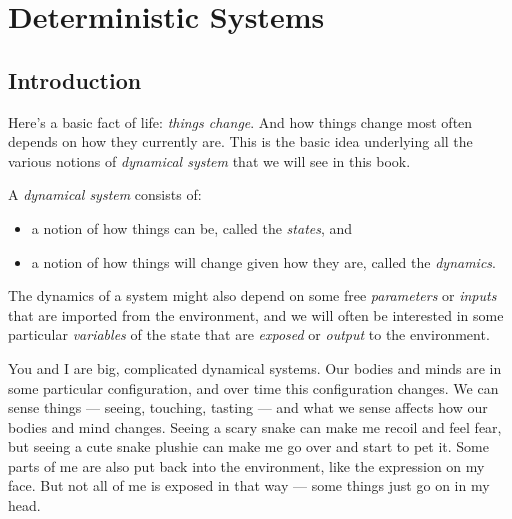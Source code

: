 \documentclass[DynamicalBook]{subfiles}
\begin{document}
%




\setcounter{chapter}{0}%


\chapter{Deterministic Systems}\label{chapter.1}

\section{Introduction}\label{sec.chap1_intro}

Here's a basic fact of life: \emph{things change}. And how things change most
often depends on how they currently are. This is the basic idea underlying all the various notions of \emph{dynamical
  system} that we will see in this book.

\begin{informal}\label{inf.dynam_sys}
  A \emph{dynamical system} consists of:
  \begin{itemize}
  \item a notion of how things can be, called the \emph{states}, and
  \item a notion of how things will change given how they are, called the \emph{dynamics}.
  \end{itemize}
  The dynamics of a system might also depend on some free \emph{parameters} or \emph{inputs} that are imported from the environment, and
  we will often be interested in some particular \emph{variables} of the
  state that are \emph{exposed} or \emph{output} to the environment. 
\end{informal}

You and I are big, complicated dynamical systems. Our bodies and minds are in
some particular configuration, and over time this configuration changes. We can
sense things --- seeing, touching, tasting --- and what we sense affects how our
bodies and mind changes. Seeing a scary snake can make me recoil and feel fear,
but seeing a cute snake plushie can make me go over and start to pet it.
Some parts of me are also put back into the environment, like the expression on
my face. But not all of me is exposed in that way --- some things just go on in
my head.
\end{document}
